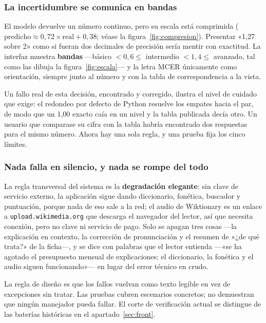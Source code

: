 \documentclass[11pt,a4paper]{article}
\newcommand{\cod}[1]{\texttt{\small #1}}
\begin{document}
\subsubsection{La incertidumbre se comunica en bandas}

El modelo devuelve un número continuo, pero su escala está comprimida
($\text{predicho} \approx 0{,}72 \times \text{real} + 0{,}38$; véase la
figura~\ref{fig:compresion}). Presentar «1,27 sobre 2» como si fueran dos decimales de
precisión sería mentir con exactitud. La interfaz muestra \textbf{bandas} —básico
$< 0{,}6 \leq$ intermedio $< 1{,}4 \leq$ avanzado, tal como las dibuja la
figura~\ref{fig:escala}— y la letra MCER únicamente como orientación, siempre junto al
número y con la tabla de correspondencia a la vista.

Un fallo real de esta decisión, encontrado y corregido, ilustra el nivel de cuidado que
exige: el redondeo por defecto de Python resuelve los empates hacia el par, de modo que
un 1,00 exacto caía en un nivel y la tabla publicada decía otro. Un usuario que
comparase su cifra con la tabla habría encontrado dos respuestas para el mismo número.
Ahora hay una sola regla, y una prueba fija los cinco límites.

\subsubsection{Nada falla en silencio, y nada se rompe del todo}

La regla transversal del sistema es la \textbf{degradación elegante}: sin clave de
servicio externo, la aplicación sigue dando diccionario, fonética, buscador y
puntuación, porque nada de eso sale a la red; el audio de Wiktionary es un enlace a
\cod{upload.wikimedia.org} que descarga el navegador del lector, así que necesita
conexión, pero no clave ni servicio de pago. Solo se apagan tres cosas —la explicación
en contexto, la corrección de pronunciación y el resumen de «¿de qué trata?» de la
ficha—, y se dice con palabras que el lector
entienda —«se ha agotado el presupuesto mensual de explicaciones; el diccionario, la
fonética y el audio siguen funcionando»— en lugar del error técnico en crudo.

La regla de diseño es que los fallos vuelvan como texto legible en vez de excepciones
sin tratar. Las pruebas cubren escenarios concretos; no demuestran que ningún manejador
pueda fallar. El corte de verificación actual se distingue de las baterías históricas
en el apartado~\ref{sec:front}.
\end{document}
